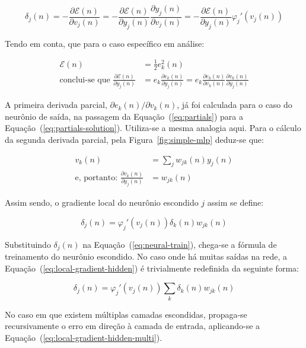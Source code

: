 \begin{equation}
\delta_j(n) = -\frac{\partial\mathcal{E}(n)}{\partial
v_j(n)} = -\frac{\partial\mathcal{E}(n)}{\partial
y_j(n)}\frac{\partial y_j(n)}{\partial v_j(n)} =
-\frac{\partial\mathcal{E}(n)}{\partial y_j(n)}\varphi_{j}'(v_j(n))
\end{equation}

Tendo em conta, que para o caso específico em análise:

\begin{align}
\mathcal{E}(n) &= \frac{1}{2}e_{k}^{2}(n) \\
\text{conclui-se que } \frac{\partial\mathcal{E}(n)}{\partial y_j(n)} &=
e_{k}\frac{\partial e_k(n)}{\partial y_j(n)} = e_{k}\frac{\partial
e_k(n)}{\partial v_k(n)}\frac{\partial v_k(n)}{\partial y_j(n)}
\end{align}

A primeira derivada parcial, $\partial e_k(n)/\partial v_k(n)$, já foi
calculada para o caso do neurônio de saída, na passagem da
Equação~(\ref{eq:partials}) para a
Equação~(\ref{eq:partials-solution}). Utiliza-se a mesma analogia aqui. Para o
cálculo da segunda derivada parcial, pela Figura~\ref{fig:simple-mlp}
deduz-se que:

\begin{align}
v_k(n) &= \sum_{j} w_{jk}(n)y_j(n) \\
\text{e, portanto: } \frac{\partial v_k(n)}{\partial y_j(n)} &= w_{jk}(n)
\end{align}

Assim sendo, o gradiente local do neurônio escondido $j$ assim se define:

\begin{equation}
\delta_j(n) = \varphi_{j}'(v_j(n))\delta_k(n)w_{jk}(n)
\label{eq:local-gradient-hidden}
\end{equation}

Substituindo $\delta_j(n)$ na Equação~(\ref{eq:neural-train}), chega-se a
fórmula de treinamento do neurônio escondido. No caso onde há muitas saídas na
rede, a Equação~(\ref{eq:local-gradient-hidden}) é trivialmente redefinida da
seguinte forma: 

\begin{equation}
\delta_j(n) = \varphi_{j}'(v_j(n))\sum_{k}\delta_k(n)w_{jk}(n)
\label{eq:local-gradient-hidden-multi}
\end{equation}

No caso em que existem múltiplas camadas escondidas, propaga-se recursivamente
o erro em direção à camada de entrada, aplicando-se a
Equação~(\ref{eq:local-gradient-hidden-multi}). 

